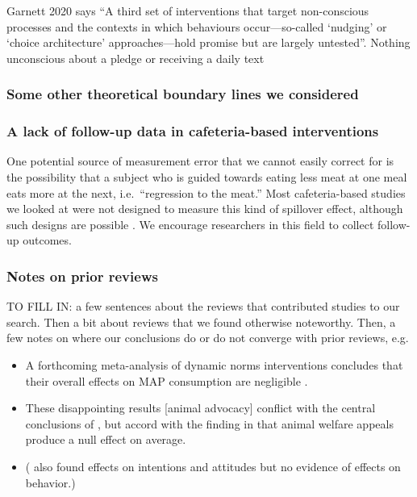 \documentclass[sn-nature,pdflatex]{sn-jnl}
\begin{document}
Garnett 2020 says ``A third set of interventions that target
non-conscious processes and the contexts in which behaviours
occur---so-called `nudging' or `choice architecture' approaches---hold
promise but are largely untested''. Nothing unconscious about a pledge
or receiving a daily text

\subsubsection{Some other theoretical boundary lines we
considered}\label{some-other-theoretical-boundary-lines-we-considered}

\subsubsection{A lack of follow-up data in cafeteria-based
interventions}\label{a-lack-of-follow-up-data-in-cafeteria-based-interventions}

One potential source of measurement error that we cannot easily correct
for is the possibility that a subject who is guided towards eating less
meat at one meal eats more at the next, i.e.~``regression to the meat.''
Most cafeteria-based studies we looked at were not designed to measure
this kind of spillover effect, although such designs are possible
\citep{vocski2024}. We encourage researchers in this field to collect
follow-up outcomes.

\subsubsection{Notes on prior reviews}\label{notes-on-prior-reviews}

TO FILL IN: a few sentences about the reviews that contributed studies
to our search. Then a bit about reviews that we found otherwise
noteworthy. Then, a few notes on where our conclusions do or do not
converge with prior reviews, e.g.

\begin{itemize}
\item
  A forthcoming meta-analysis of dynamic norms interventions concludes
  that their overall effects on MAP consumption are negligible
  \citep{Weikertova2024}.
\item
  These disappointing results {[}animal advocacy{]} conflict with the
  central conclusions of \citep{mathur2021effectiveness}, but accord
  with the finding in \citep{DiGennaro2024} that animal welfare appeals
  produce a null effect on average.
\item
  (\citep{bianchi2018conscious} also found effects on intentions and
  attitudes but no evidence of effects on behavior.)
\end{itemize}

\newpage

\renewcommand\refname{References}

\end{document}
